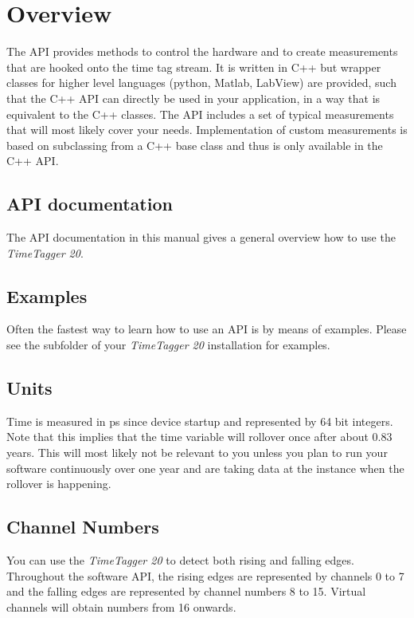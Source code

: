 \documentclass[letterpaper,10pt,english]{sphinxmanual}
\begin{document}
\section{Overview}
\label{sections/api:overview}
The API provides methods to control the hardware and to create
measurements that are hooked onto the time tag stream. It is written in C++ but
wrapper classes for higher level languages (python, Matlab, LabView)
are provided, such that the C++ API can directly be used in your application,
in a way that is equivalent to the C++ classes.
The API includes a set of typical measurements that will most likely
cover your needs. Implementation of custom measurements is based on
subclassing from a C++ base class and thus is only available in the C++ API.


\subsection{API documentation}
\label{sections/api:api-documentation}
The API documentation in this manual gives a general overview how to use the \emph{TimeTagger 20}.


\subsection{Examples}
\label{sections/api:examples}
Often the fastest way to learn how to use an API is by means of examples. Please see the 
subfolder of your \emph{TimeTagger 20} installation for examples.


\subsection{Units}
\label{sections/api:units}
Time is measured in ps since device startup and represented by 64 bit integers. Note that this
implies that the time variable will rollover once after about 0.83 years. This
will most likely not be relevant to you unless you plan to run your software
continuously over one year and are taking data at the instance when the rollover is happening.


\subsection{Channel Numbers}
\label{sections/api:channel-numbers}
You can use the \emph{TimeTagger 20} to detect both rising and falling edges. Throughout
the software API, the rising edges are represented by channels 0 to 7 and
the falling edges are represented by channel numbers 8 to 15. Virtual channels will obtain numbers
from 16 onwards.
\end{document}
